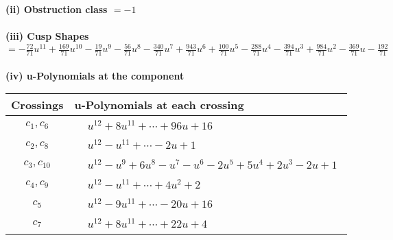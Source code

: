 \documentclass[1p]{elsarticle_modified}
\theoremstyle{definition}
\begin{document}
\flushleft \textbf{(ii) Obstruction class $= -1$}\\~\\
\flushleft \textbf{(iii) Cusp Shapes $= -\frac{72}{71} u^{11}+\frac{169}{71} u^{10}-\frac{19}{71} u^9-\frac{56}{71} u^8-\frac{340}{71} u^7+\frac{943}{71} u^6+\frac{100}{71} u^5-\frac{288}{71} u^4-\frac{394}{71} u^3+\frac{984}{71} u^2-\frac{369}{71} u-\frac{192}{71}$}\\~\\
\newpage\renewcommand{\arraystretch}{1}
\flushleft \textbf{(iv) u-Polynomials at the component}\newline \\
\begin{tabular}{m{50pt}|m{274pt}}
Crossings & \hspace{64pt}u-Polynomials at each crossing \\
\hline $$\begin{aligned}c_{1},c_{6}\end{aligned}$$&$\begin{aligned}
&u^{12}+8 u^{11}+\cdots+96 u+16
\end{aligned}$\\
\hline $$\begin{aligned}c_{2},c_{8}\end{aligned}$$&$\begin{aligned}
&u^{12}- u^{11}+\cdots-2 u+1
\end{aligned}$\\
\hline $$\begin{aligned}c_{3},c_{10}\end{aligned}$$&$\begin{aligned}
&u^{12}- u^9+6 u^8- u^7- u^6-2 u^5+5 u^4+2 u^3-2 u+1
\end{aligned}$\\
\hline $$\begin{aligned}c_{4},c_{9}\end{aligned}$$&$\begin{aligned}
&u^{12}- u^{11}+\cdots+4 u^2+2
\end{aligned}$\\
\hline $$\begin{aligned}c_{5}\end{aligned}$$&$\begin{aligned}
&u^{12}-9 u^{11}+\cdots-20 u+16
\end{aligned}$\\
\hline $$\begin{aligned}c_{7}\end{aligned}$$&$\begin{aligned}
&u^{12}+8 u^{11}+\cdots+22 u+4
\end{aligned}$\\
\hline
\end{tabular}\\~\\
\end{document}
